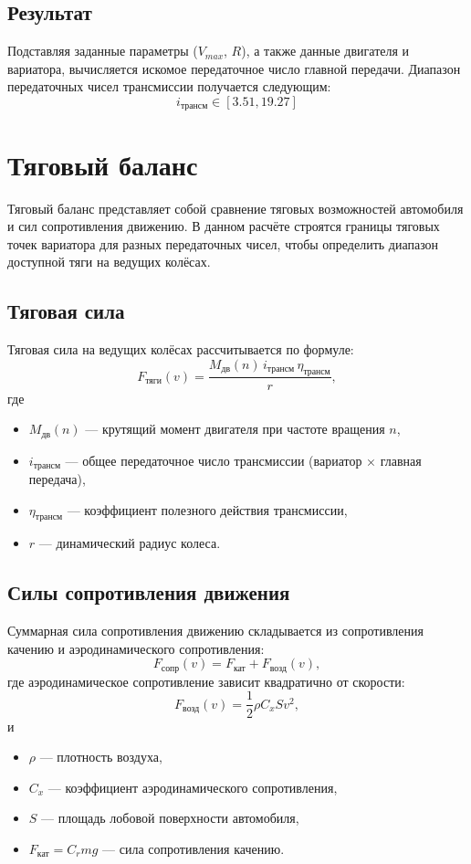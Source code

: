 \subsection*{Результат}

Подставляя заданные параметры ($V_{max}$, $R$), а также данные двигателя и вариатора, вычисляется искомое передаточное число главной передачи. Диапазон передаточных чисел трансмиссии получается следующим:
\[
i_{\text{трансм}} \in [3.51, 19.27]
\]

\section{Тяговый баланс}

Тяговый баланс представляет собой сравнение тяговых возможностей автомобиля и сил сопротивления движению. В данном расчёте строятся границы тяговых точек вариатора для разных передаточных чисел, чтобы определить диапазон доступной тяги на ведущих колёсах.

\subsection*{Тяговая сила}

Тяговая сила на ведущих колёсах рассчитывается по формуле:
\[
F_{\text{тяги}}(v) = \frac{M_{\text{дв}}(n)\, i_{\text{трансм}}\, \eta_{\text{трансм}}}{r},
\]
где
\begin{itemize}
  \item $M_{\text{дв}}(n)$ — крутящий момент двигателя при частоте вращения $n$,
  \item $i_{\text{трансм}}$ — общее передаточное число трансмиссии (вариатор × главная передача),
  \item $\eta_{\text{трансм}}$ — коэффициент полезного действия трансмиссии,
  \item $r$ — динамический радиус колеса.
\end{itemize}

\subsection*{Силы сопротивления движения}

Суммарная сила сопротивления движению складывается из сопротивления качению и аэродинамического сопротивления:
\[
F_{\text{сопр}}(v) = F_{\text{кат}} + F_{\text{возд}}(v),
\]
где аэродинамическое сопротивление зависит квадратично от скорости:
\[
F_{\text{возд}}(v) = \frac{1}{2} \rho C_x S v^2,
\]
и
\begin{itemize}
  \item $\rho$ — плотность воздуха,
  \item $C_x$ — коэффициент аэродинамического сопротивления,
  \item $S$ — площадь лобовой поверхности автомобиля,
  \item $F_{\text{кат}} = C_r m g$ — сила сопротивления качению.
\end{itemize}

